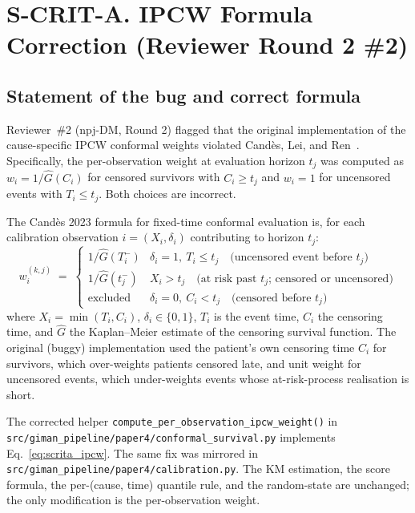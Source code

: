 \documentclass[11pt]{article}
\begin{document}
\section*{S-CRIT-A. IPCW Formula Correction (Reviewer Round 2 \#2)}
\label{sec:s-crit-a}

\subsection*{Statement of the bug and correct formula}

Reviewer~\#2 (npj-DM, Round 2) flagged that the original implementation of the cause-specific IPCW conformal weights violated Cand\`{e}s, Lei, and Ren~\cite{candes2023conformal}. Specifically, the per-observation weight at evaluation horizon $t_j$ was computed as $w_i = 1/\hat{G}(C_i)$ for censored survivors with $C_i \geq t_j$ and $w_i = 1$ for uncensored events with $T_i \leq t_j$. Both choices are incorrect.

The Cand\`{e}s 2023 formula for fixed-time conformal evaluation is, for each calibration observation $i = (X_i, \delta_i)$ contributing to horizon $t_j$:
\begin{equation}
w_i^{(k,j)} \;=\; \begin{cases}
1/\hat{G}(T_i^-) & \delta_i = 1,\ T_i \leq t_j \quad\text{(uncensored event before }t_j\text{)} \\
1/\hat{G}(t_j^-) & X_i > t_j \quad\text{(at risk past }t_j\text{; censored or uncensored)} \\
\text{excluded} & \delta_i = 0,\ C_i < t_j \quad\text{(censored before }t_j\text{)}
\end{cases}
\label{eq:scrita_ipcw}
\end{equation}
where $X_i = \min(T_i, C_i)$, $\delta_i \in \{0,1\}$, $T_i$ is the event time, $C_i$ the censoring time, and $\hat{G}$ the Kaplan--Meier estimate of the censoring survival function. The original (buggy) implementation used the patient's own censoring time $C_i$ for survivors, which over-weights patients censored late, and unit weight for uncensored events, which under-weights events whose at-risk-process realisation is short.

The corrected helper \texttt{compute\_per\_observation\_ipcw\_weight()} in \texttt{src/giman\_pipeline/paper4/conformal\_survival.py} implements Eq.~\ref{eq:scrita_ipcw}. The same fix was mirrored in \texttt{src/giman\_pipeline/paper4/calibration.py}. The KM estimation, the score formula, the per-(cause, time) quantile rule, and the random-state are unchanged; the only modification is the per-observation weight.
\end{document}
